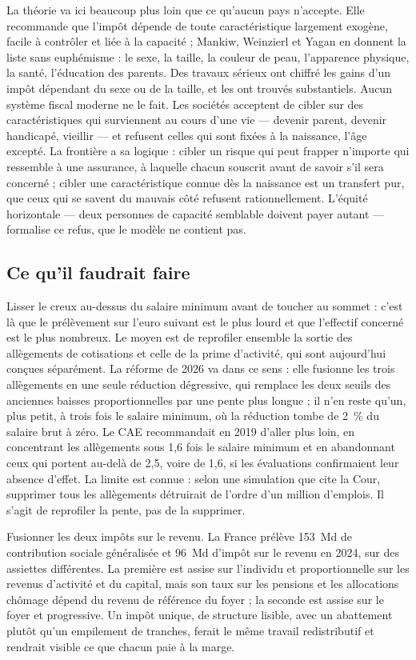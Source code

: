 \documentclass[11pt,a4paper]{article}
\providecommand{\euro}{\texteuro}
\begin{document}
La théorie va ici beaucoup plus loin que ce qu'aucun pays n'accepte. Elle recommande que l'impôt
dépende de toute caractéristique largement exogène, facile à contrôler et liée à la capacité ;
Mankiw, Weinzierl et Yagan en donnent la liste sans euphémisme : le sexe, la taille, la couleur de
peau, l'apparence physique, la santé, l'éducation des parents. Des travaux sérieux ont chiffré les
gains d'un impôt dépendant du sexe ou de la taille, et les ont trouvés substantiels. Aucun système
fiscal moderne ne le fait. Les sociétés acceptent de cibler sur des caractéristiques qui surviennent
au cours d'une vie --- devenir parent, devenir handicapé, vieillir --- et refusent celles qui sont
fixées à la naissance, l'âge excepté. La frontière a sa logique : cibler un risque qui peut frapper
n'importe qui ressemble à une assurance, à laquelle chacun souscrit avant de savoir s'il sera
concerné ; cibler une caractéristique connue dès la naissance est un transfert pur, que ceux qui se
savent du mauvais côté refusent rationnellement. L'équité horizontale --- deux personnes de capacité
semblable doivent payer autant --- formalise ce refus, que le modèle ne contient pas.

\subsection{Ce qu'il faudrait faire}

Lisser le creux au-dessus du salaire minimum avant de toucher au sommet : c'est là que le
prélèvement sur l'euro suivant est le plus lourd et que l'effectif concerné est le plus nombreux.
Le moyen est de reprofiler ensemble la sortie des allègements de cotisations et celle de la prime
d'activité, qui sont aujourd'hui conçues séparément. La réforme de 2026 va dans ce sens : elle
fusionne les trois allègements en une seule réduction dégressive, qui remplace les deux seuils des
anciennes baisses proportionnelles par une pente plus longue ; il n'en reste qu'un, plus petit, à
trois fois le salaire minimum, où la réduction tombe de 2~\% du salaire brut à zéro. Le CAE recommandait en 2019 d'aller plus loin, en concentrant les allègements
sous 1,6 fois le salaire minimum et en abandonnant ceux qui portent au-delà de 2,5, voire de 1,6,
si les évaluations confirmaient leur absence d'effet. La limite est connue : selon une simulation
que cite la Cour, supprimer tous les allègements détruirait de l'ordre d'un million d'emplois. Il
s'agit de reprofiler la pente, pas de la supprimer.

Fusionner les deux impôts sur le revenu. La France prélève 153~Md\euro{} de contribution sociale
généralisée et 96~Md\euro{} d'impôt sur le revenu en 2024, sur des assiettes différentes. La
première est assise sur l'individu et proportionnelle sur les revenus d'activité et du capital,
mais son taux sur les pensions et les allocations chômage dépend du revenu de référence du foyer ;
la seconde est assise sur le foyer et progressive. Un impôt unique, de structure lisible, avec un
abattement plutôt qu'un empilement de tranches, ferait le même travail redistributif et rendrait
visible ce que chacun paie à la marge.
\end{document}
